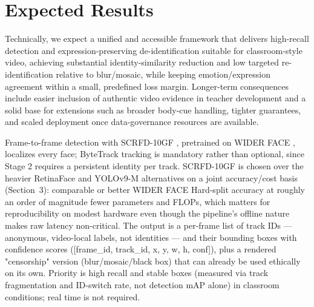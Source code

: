 \documentclass[12pt]{article}
\begin{document}
\section{Expected Results}

Technically, we expect a unified and accessible framework that delivers high-recall detection and expression-preserving de-identification suitable for classroom-style video, achieving substantial identity-similarity reduction and low targeted re-identification relative to blur/mosaic, while keeping emotion/expression agreement within a small, predefined loss margin. Longer-term consequences include easier inclusion of authentic video evidence in teacher development and a solid base for extensions such as broader body-cue handling, tighter guarantees, and scaled deployment once data-governance resources are available.

Frame-to-frame detection with SCRFD-10GF \cite{scrfd}, pretrained on WIDER FACE \cite{widerface}, localizes every face; ByteTrack tracking is mandatory rather than optional, since Stage 2 requires a persistent identity per track. SCRFD-10GF is chosen over the heavier RetinaFace and YOLOv9-M alternatives on a joint accuracy/cost basis (Section~3): comparable or better WIDER FACE Hard-split accuracy at roughly an order of magnitude fewer parameters and FLOPs, which matters for reproducibility on modest hardware even though the pipeline's offline nature makes raw latency non-critical. The output is a per-frame list of track IDs — anonymous, video-local labels, not identities — and their bounding boxes with confidence scores ([frame\_id, track\_id, x, y, w, h, conf]), plus a rendered "censorship" version (blur/mosaic/black box) that can already be used ethically on its own. Priority is high recall and stable boxes (measured via track fragmentation and ID-switch rate, not detection mAP alone) in classroom conditions; real time is not required.
\end{document}
